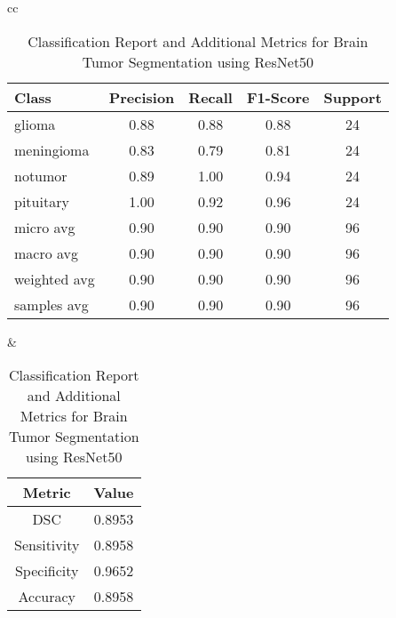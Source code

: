 \begin{table}[ht]
\centering
\begin{tabular}{cc}
    \begin{minipage}{.6\linewidth}
        \centering
        \begin{subtable}[t]{\linewidth}
            \centering
            \begin{tabular}{|l|c|c|c|c|}
                \hline 
                \textbf{Class} & \textbf{Precision} & \textbf{Recall} & \textbf{F1-Score} & \textbf{Support} \\ 
                \hline 
                glioma      & 0.88 & 0.88 & 0.88 & 24 \\ 
                \hline
                meningioma  & 0.83 & 0.79 & 0.81 & 24 \\ 
                \hline
                notumor     & 0.89 & 1.00 & 0.94 & 24 \\ 
                \hline
                pituitary   & 1.00 & 0.92 & 0.96 & 24 \\ 
                \hline
                micro avg   & 0.90 & 0.90 & 0.90 & 96 \\ 
                \hline
                macro avg   & 0.90 & 0.90 & 0.90 & 96 \\ 
                \hline
                weighted avg & 0.90 & 0.90 & 0.90 & 96 \\ 
                \hline
                samples avg & 0.90 & 0.90 & 0.90 & 96 \\ 
                \hline
            \end{tabular}
            \caption{Classification Report for Brain Tumor Segmentation} 
            \label{tab:resnet50_classification_report}
        \end{subtable}
    \end{minipage} &
    \begin{minipage}{.35\linewidth}
        \centering
        \begin{subtable}[t]{\linewidth}
            \centering
            \begin{tabular}{|c|c|}
                \hline 
                \textbf{Metric} & \textbf{Value} \\ 
                \hline
                DSC & 0.8953 \\ 
                \hline
                Sensitivity & 0.8958 \\ 
                \hline
                Specificity & 0.9652 \\ 
                \hline
                Accuracy & 0.8958 \\ 
                \hline
            \end{tabular}
            \caption{Additional Metrics for Brain Tumor Segmentation} 
            \label{tab:resnet50_additional_metrics}
        \end{subtable}
    \end{minipage}
\end{tabular}
\caption{Classification Report and Additional Metrics for Brain Tumor Segmentation using ResNet50}
\label{tab:combined_resnet50_metrics}
\end{table}

